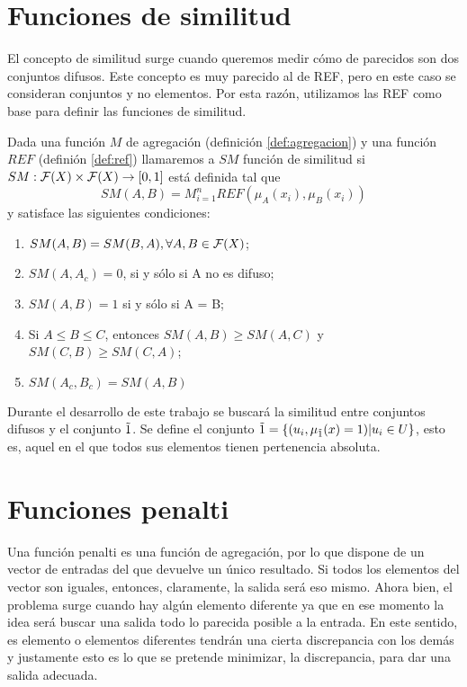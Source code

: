 \documentclass[main]{subfiles}
\begin{document}
\section{Funciones de similitud}\label{sec:similitud}
El concepto de similitud \cite{art:fan1, art:fan2} surge cuando queremos medir cómo de parecidos son dos conjuntos difusos. Este concepto es muy parecido al de REF, pero en este caso se consideran conjuntos y no elementos. Por esta razón, utilizamos las REF como base para definir las funciones de similitud.
\begin{definition}\label{def:similitud}
Dada una función $M$ de agregación (definición \ref{def:agregacion}) y una función $REF$ (definión \ref{def:ref}) llamaremos a $SM$ función de similitud si ${SM : \mathcal{F}(X) \times \mathcal{F}(X) \rightarrow [0,1]}$ está definida tal que
$$SM(A,B)=M^n_{i=1}REF(\mu_A(x_i), \mu_B(x_i))$$
y satisface las siguientes condiciones:
	\begin{enumerate}
	\item $SM(A, B) = SM(B, A), \forall A, B \in \mathcal{F}(X)$;
	\item $SM(A, A_c) = 0$, si y sólo si A no es difuso;
	\item $SM(A, B) = 1$ si y sólo si A = B;
	\item Si $A\leq B\leq C$, entonces $SM(A, B)\geq SM(A,C)$ y $SM(C, B)\geq SM(C,A)$;
	\item $SM(A_c, B_c) = SM(A,B)$
	\end{enumerate}
\end{definition}

\begin{remark}\label{obs:funcionesref}
Durante el desarrollo de este trabajo se buscará la similitud entre conjuntos difusos y el conjunto $\tilda1$. Se define el conjunto ${\tilda1 =\{(u_{i}, \mu_{\tilda1}(x)=1)|u_{i}\in U \}}$, esto es, aquel en el que todos sus elementos tienen pertenencia absoluta.
\end{remark}


\section{Funciones penalti}\label{sec:penalti}
Una función penalti  \cite{art:calvo} es una función de agregación, por lo que dispone de un vector de entradas del que devuelve un único resultado. Si todos los elementos del vector son iguales, entonces, claramente, la salida será eso mismo. Ahora bien, el problema surge cuando hay algún elemento diferente ya que en ese momento la idea será buscar una salida todo lo parecida posible a la entrada. En este sentido, es elemento o elementos diferentes tendrán una cierta discrepancia con los demás y justamente esto es lo que se pretende minimizar, la discrepancia, para dar una salida adecuada.
\end{document}
